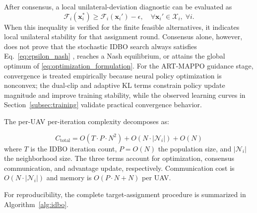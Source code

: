 \documentclass[lettersize,journal]{IEEEtran}
\providecommand{\DIFadd}[1]{{\protect\color{blue} #1}} %
\providecommand{\DIFdel}[1]{} %
\providecommand{\DIFaddbegin}{} %
\providecommand{\DIFaddend}{} %
\providecommand{\DIFdelbegin}{} %
\providecommand{\DIFdelend}{} %
\begin{document}
\DIFdelbegin \DIFdel{The resulting assignment $\mathbf{X}^{*}$ can be interpreted as an $\epsilon$-approximate
Nash equilibrium of the distributed assignment game induced by the local utilities
$\mathcal{F}_i$. Specifically, after consensus, no interceptor can unilaterally switch to
another feasible target and improve its local utility by more than $\epsilon$ without either
losing the auction for that target or violating the capacity constraint:
}\DIFdelend \DIFaddbegin \DIFadd{After consensus, a local unilateral-deviation diagnostic can be evaluated as
}\DIFaddend \begin{equation}
\label{eq:epsilon_nash}
\mathcal{F}_i(\mathbf{x}_i^{*})
\geq \mathcal{F}_i(\mathbf{x}_i')-\epsilon,\quad
\forall \mathbf{x}_i'\in\mathcal{X}_i,\;\forall i .
\end{equation}
\DIFdelbegin \DIFdel{This equilibrium property is local and assignment-round specific. It ensures consistency and
unilateral stability of the distributed decision, but it does not imply that IDBO always
attains the globally optimal solution }\DIFdelend \DIFaddbegin \DIFadd{When this inequality is verified for the finite feasible alternatives, it
indicates local unilateral stability for that assignment round. Consensus
alone, however, does not prove that the stochastic IDBO search always satisfies
Eq.~}\eqref{eq:epsilon_nash}\DIFadd{, reaches a Nash equilibrium, or attains the global
optimum }\DIFaddend of \eqref{eq:optimization_formulation}. For the
ART-MAPPO guidance stage, convergence is treated empirically because neural policy
optimization is nonconvex; the dual-clip and adaptive KL terms constrain policy update
magnitude and improve training stability, while the observed learning curves in
Section~\ref{subsec:training} validate practical convergence behavior.

The per-UAV per-iteration complexity decomposes as:

\begin{equation}
\label{eq:complexity}
C_{\text{total}} = O(T \cdot P \cdot N^2) + O(N \cdot |\mathcal{N}_i|) + O(N)
\end{equation}
where $T$ is the IDBO iteration count, $P = O(N)$ the population size, and $|\mathcal{N}_i|$ the neighborhood size. The three terms account for optimization, consensus communication, and advantage update, respectively. Communication cost is $O(N \cdot |\mathcal{N}_i|)$ and memory is $O(P \cdot N + N)$ per UAV.

For reproducibility, the complete target-assignment procedure is summarized in
Algorithm~\ref{alg:idbo}.
\end{document}
